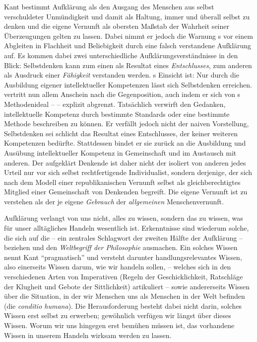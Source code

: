 Kant bestimmt Aufklärung als den Ausgang des Menschen aus selbst verschuldeter
Unmündigkeit und damit als Haltung, immer und überall selbst zu denken und die
eigene Vernunft als obersten Maßstab der Wahrheit seiner Überzeugungen gelten zu
lassen. Dabei nimmt er jedoch die Warnung
s vor einem
Abgleiten in Flachheit und Beliebigkeit durch eine falsch verstandene Aufklärung
auf. Es kommen dabei zwei unterschiedliche Aufklärungsverständnisse in den
Blick: Selbstdenken kann zum einen als Resultat eines \emph{Entschlusses}, zum
anderen als Ausdruck einer \emph{Fähigkeit} verstanden werden.
s Einsicht
ist: Nur durch die Ausbildung eigener intellektueller Kompetenzen lässt sich
Selbstdenken erreichen.  vertritt nun allem Anschein nach
die Gegenposition, auch indem er sich von
s
Methodenideal --  -- explizit abgrenzt. Tatsächlich
verwirft  den Gedanken, intellektuelle Kompetenz durch
bestimmte Standards oder eine bestimmte Methode beschreiben zu können. Er
verfällt jedoch nicht der naiven Vorstellung, Selbstdenken sei schlicht das
Resultat eines Entschlusses, der keiner weiteren Kompetenzen bedürfte.
Stattdessen bindet er sie zurück an die Ausbildung und Ausübung intellektueller
Kompetenz in Gemeinschaft und im Austausch mit anderen. Der aufgeklärt Denkende
ist daher nicht der isoliert von anderen jedes Urteil nur vor sich selbst
rechtfertigende Individualist, sondern derjenige, der sich nach dem Modell
einer republikanischen Vernunft selbst als gleichberechtigtes Mitglied einer
Gemeinschaft von Denkenden begreift. Die eigene Vernunft ist zu verstehen als
der je eigene \emph{Gebrauch} der \emph{allgemeinen} Menschenvernunft.

Aufklärung verlangt von uns nicht, alles zu wissen, sondern das zu
wissen, was für unser alltägliches Handeln wesentlich ist. 
Erkenntnisse sind wiederum solche, die sich auf die  -- ein zentrales Schlagwort der zweiten Hälfte der Aufklärung --
beziehen und den \emph{Weltbegriff der Philosophie} ausmachen. Ein solches
Wissen nennt Kant \enquote{pragmatisch} und versteht darunter
handlungsrelevantes Wissen, also einerseits Wissen darum, wie wir handeln
sollen, -- welches sich in den verschiedenen Arten von Imperativen (Regeln der
Geschicklichkeit, Ratschläge der Klugheit und Gebote der Sittlichkeit)
artikuliert -- sowie andererseits Wissen über die Situation, in der wir Menschen
uns als Menschen in der Welt befinden (die \emph{conditio humana}). Die
Herausforderung besteht dabei nicht darin, solches Wissen erst selbst zu
erwerben; gewöhnlich verfügen wir längst über dieses Wissen. Worum wir uns
hingegen erst bemühen müssen ist, das vorhandene Wissen in unserem Handeln
wirksam werden zu lassen.

